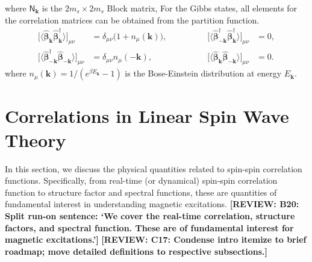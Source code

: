 \documentclass[aps, prx, nofootinbib, superscriptaddress]{revtex4-2}
\newcommand{\REVIEW}[1]{{\color{reviewcolor}\bfseries [REVIEW: #1]}}
\newcommand{\kvec}{\mathbf{k}}
\begin{document}
where $\mathsf{N}_{\kvec}$ is the $2m_{s} \times 2m_{s}$ Block matrix, 
For the Gibbs states, all elements for the correlation matrices can be obtained from the partition function. 
\begin{equation}
    \begin{array}{rlrl}
        \big[ \langle \hat{\bm \beta}_{ \kvec}^{\phantom \dagger} \hat{\bm \beta}_{ \kvec}^{\dagger} \rangle \big]_{\mu\nu} 
        & = \delta_{\mu\nu} \big( 1 + n_{\mu}(\kvec) \big) , 
        \qquad & \qquad 
        \big[ \langle \hat{\bm\beta}_{-\kvec}^{\dagger} \hat{\bm\beta}_{\kvec}^{\dagger} \rangle \big]_{\mu\nu} & = 0  ,
        \\[0.5em]
        \big[ \langle \hat{\bm\beta}_{-\kvec}^{\dagger} \hat{\bm\beta}_{- \kvec}^{\phantom \dagger} \rangle \big]_{\mu\nu}
        & = \delta_{\mu\nu} n_{\mu}(-\kvec) ,
        \qquad & \qquad 
        \big[ \langle \hat{\bm\beta}_{\kvec} \hat{\bm\beta}_{-\kvec} \rangle \big]_{\mu\nu} & = 0.
    \end{array}
\end{equation}
where $n_{\mu}(\kvec) = 1/(e^{\beta E_{\kvec}} - 1)$ is the Bose-Einstein distribution at energy $E_{\kvec}$. 








\newpage
\section{Correlations in Linear Spin Wave Theory}

In this section, we discuss the physical quantities related to spin-spin correlation functions. Specifically, from real-time (or dynamical) spin-spin correlation function to structure factor and spectral functions, these are quantities of fundamental interest in understanding magnetic excitations.
\REVIEW{B20: Split run-on sentence: `We cover the real-time correlation, structure factors, and spectral function. These are of fundamental interest for magnetic excitations.'}
\REVIEW{C17: Condense intro itemize to brief roadmap; move detailed definitions to respective subsections.}
\end{document}
